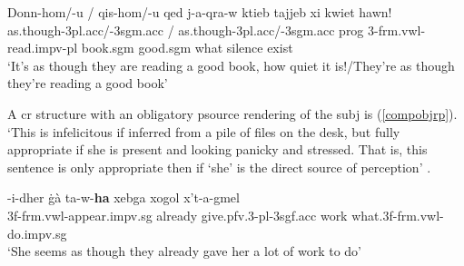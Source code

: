 \documentclass[output=paper]{LSP/langsci}
\begin{document}
 \ea \label{EventPsource}
 \gll Donn-hom/-u / qis-hom/-u qed j-a-qra-w ktieb tajjeb xi kwiet hawn!\\
 as.though-{\sc 3pl.acc/-3sgm.acc} / as.though-{\sc 3pl.acc/-3sgm.acc} {\sc prog} 3-{\sc frm.vwl}-read.{\sc impv-pl} book.{\sc sgm} good.{\sc sgm} what silence {\sc exist}\\
 \glt `It's as though they are reading a good book, how quiet it is!/They're as though they're reading a good book' \hfill{\citep[181]{Camilleri16}}  
 \z
 

A {\sc cr} structure with an obligatory {\sc psource} rendering of the {\sc subj} is (\ref{compobjrp}). `This is infelicitous if inferred from a pile of files on the desk, but fully appropriate if she is present and looking panicky and stressed. That is, this sentence is only appropriate then if `she' is the direct source of perception' .

\ea \label{compobjrp}
-i-dher {\.g}{\`a} ta-w-{\bf{ha}} xebg\textcrh a xog\textcrh ol x't-a-g\textcrh mel\\
3{\sc f}-{\sc frm.vwl}-appear.{\sc impv.sg} already give.{\sc pfv.3-pl-3sgf.acc}  work what.3{\sc f}-{\sc frm.vwl}-do.{\sc impv.sg}\\
\glt `She seems as though they already gave her a lot of work to do' \hfill{\citep[{\sc comp obj};][192]{CES:LFG14}}
\z
\end{document}
